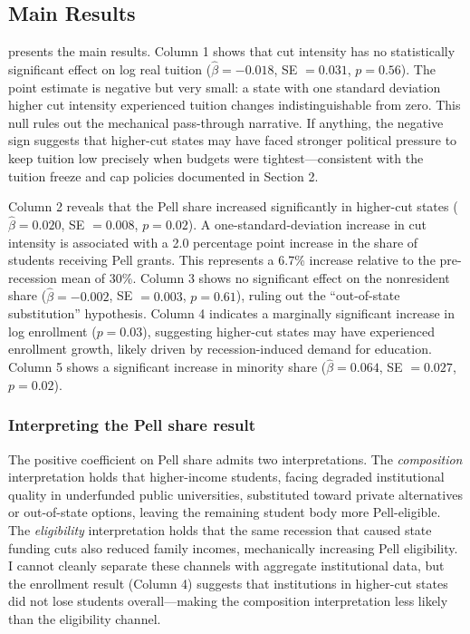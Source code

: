 \documentclass[12pt]{article}
\begin{document}
\subsection{Main Results}



 presents the main results. Column 1 shows that cut intensity has no statistically significant effect on log real tuition ($\hat{\beta} = -0.018$, SE $= 0.031$, $p = 0.56$). The point estimate is negative but very small: a state with one standard deviation higher cut intensity experienced tuition changes indistinguishable from zero. This null rules out the mechanical pass-through narrative. If anything, the negative sign suggests that higher-cut states may have faced stronger political pressure to keep tuition low precisely when budgets were tightest---consistent with the tuition freeze and cap policies documented in Section 2.

Column 2 reveals that the Pell share increased significantly in higher-cut states ($\hat{\beta} = 0.020$, SE $= 0.008$, $p = 0.02$). A one-standard-deviation increase in cut intensity is associated with a 2.0 percentage point increase in the share of students receiving Pell grants. This represents a 6.7\% increase relative to the pre-recession mean of 30\%. Column 3 shows no significant effect on the nonresident share ($\hat{\beta} = -0.002$, SE $= 0.003$, $p = 0.61$), ruling out the ``out-of-state substitution'' hypothesis. Column 4 indicates a marginally significant increase in log enrollment ($p = 0.03$), suggesting higher-cut states may have experienced enrollment growth, likely driven by recession-induced demand for education. Column 5 shows a significant increase in minority share ($\hat{\beta} = 0.064$, SE $= 0.027$, $p = 0.02$).

\subsubsection*{Interpreting the Pell share result} The positive coefficient on Pell share admits two interpretations. The \textit{composition} interpretation holds that higher-income students, facing degraded institutional quality in underfunded public universities, substituted toward private alternatives or out-of-state options, leaving the remaining student body more Pell-eligible. The \textit{eligibility} interpretation holds that the same recession that caused state funding cuts also reduced family incomes, mechanically increasing Pell eligibility. I cannot cleanly separate these channels with aggregate institutional data, but the enrollment result (Column 4) suggests that institutions in higher-cut states did not lose students overall---making the composition interpretation less likely than the eligibility channel.
\end{document}

